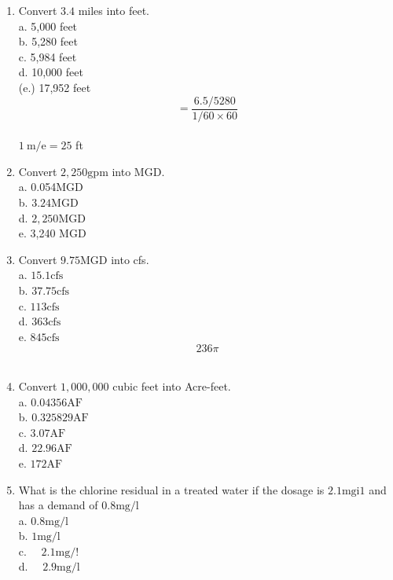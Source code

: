 \begin{enumerate}
\item Convert $3.4$ miles into feet.\\
a. 5,000 feet\\
b. 5,280 feet\\
c. 5,984 feet\\
d. 10,000 feet\\
(e.) 17,952 feet\\
$$=\frac{6.5 / 5280}{1 / 60 \times 60}$$\\
$1 \mathrm{~m} / \mathrm{e}=25$ ft\\

\item Convert $2,250 \mathrm{gpm}$ into MGD.\\
a. 0.054MGD\\
b. $3.24 \mathrm{MGD}$\\
d. $2,250 \mathrm{MGD}$\\
e. 3,240 MGD\\

\item Convert $9.75 \mathrm{MGD}$ into cfs.\\
a.  $15.1 \mathrm{cfs}$\\
b. $37.75 \mathrm{cfs}$\\
c. $113 \mathrm{cfs}$\\
d. $363 \mathrm{cfs}$\\
e. $845 \mathrm{cfs}$\\
$$236 \pi$$\\

\item Convert $1,000,000$ cubic feet into Acre-feet.\\
a. $0.04356 \mathrm{AF}$\\
b. $0.325829 \mathrm{AF}$\\
c. $3.07 \mathrm{AF}$\\
d. $22.96 \mathrm{AF}$\\
e. $172 \mathrm{AF}$\\

\item What is the chlorine residual in a treated water if the dosage is $2.1 \mathrm{mgi1}$ and has a demand of $0.8 \mathrm{mg} / \mathrm{l}$\\
a. $0.8 \mathrm{mg} / \mathrm{l}$\\
b. $1 \mathrm{mg} / \mathrm{l}$\\
c. $\quad 2.1 \mathrm{mg} / !$\\
d. $\quad 2.9 \mathrm{mg} / \mathrm{l}$\\


\end{enumerate}

